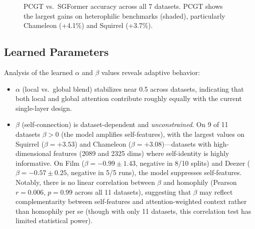 \begin{figure}[t]
{
}%
\caption{PCGT vs.\ SGFormer accuracy across all 7 datasets. PCGT shows the largest gains on heterophilic benchmarks (shaded), particularly Chameleon (+4.1\%) and Squirrel (+3.7\%).}
\label{fig:comparison}
\end{figure}

\subsection{Learned Parameters}

Analysis of the learned $\alpha$ and $\beta$ values reveals adaptive behavior:
\begin{itemize}
\item $\alpha$ (local vs.~global blend) stabilizes near 0.5 across datasets, indicating that both local and global attention contribute roughly equally with the current single-layer design.
\item $\beta$ (self-connection) is dataset-dependent and \emph{unconstrained}. On 9 of 11 datasets $\beta > 0$ (the model amplifies self-features), with the largest values on Squirrel ($\beta = +3.53$) and Chameleon ($\beta = +3.08$)---datasets with high-dimensional features (2089 and 2325 dims) where self-identity is highly informative. On Film ($\beta = -0.99 \pm 1.43$, negative in 8/10 splits) and Deezer ($\beta = -0.57 \pm 0.25$, negative in 5/5 runs), the model suppresses self-features. Notably, there is no linear correlation between $\beta$ and homophily (Pearson $r = 0.006$, $p = 0.99$ across all 11 datasets), suggesting that $\beta$ may reflect complementarity between self-features and attention-weighted context rather than homophily per se (though with only 11 datasets, this correlation test has limited statistical power).
\end{itemize}


